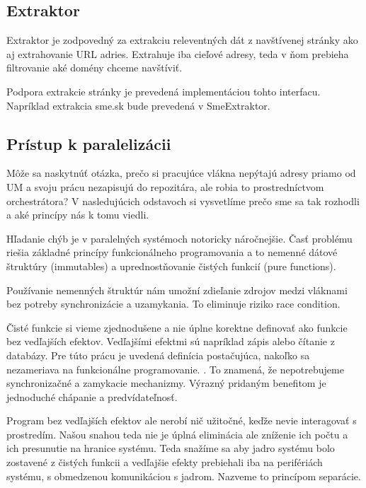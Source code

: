 \subsection{Extraktor}
Extraktor je zodpovedný za extrakciu releventných dát z navštívenej stránky ako aj extrahovanie URL adries. Extrahuje iba cieľové adresy, teda v ňom prebieha filtrovanie aké domény chceme navštíviť. 

Podpora extrakcie stránky je prevedená implementáciou tohto interfacu. Napríklad extrakcia sme.sk bude prevedená v SmeExtraktor.


\subsection{Prístup k paralelizácii}
Môže sa naskytnúť otázka, prečo si pracujúce vlákna nepýtajú adresy priamo od UM a svoju prácu nezapisujú do repozitára, ale robia to prostredníctvom orchestrátora? V nasledujúcich odstavoch si vysvetlíme prečo sme sa tak rozhodli a aké princípy nás k tomu viedli. 

Hľadanie chýb je v paralelných systémoch notoricky náročnejšie. Časť problému riešia základné princípy funkcionálneho programovania a to nemenné dátové štruktúry (immutables) a uprednostňovanie čistých funkcií (pure functions). 

Používanie nemenných štruktúr nám umožní zdieľanie zdrojov medzi vláknami bez potreby synchronizácie a uzamykania. To eliminuje riziko race condition.

Čisté funkcie si vieme zjednodušene a nie úplne korektne definovať ako funkcie bez vedľajších efektov. Vedľajšími efektmi sú napríklad zápis alebo čítanie z databázy. Pre túto prácu je uvedená definícia postačujúca, nakoľko sa nezameriava na funkcionálne programovanie. . To znamená, že nepotrebujeme synchronizačné a zamykacie mechanizmy. Výrazný pridaným benefitom je jednoduché chápanie a predvídateľnosť. 

Program bez vedľajších efektov ale nerobí nič užitočné, keďže nevie interagovať s prostredím. Našou snahou teda nie je úplná eliminácia ale zníženie ich počtu a ich presunutie na hranice systému. Teda snažíme sa aby jadro systému bolo zostavené z čistých funkcii a vedľajšie efekty prebiehali iba na perifériách systému, s obmedzenou komunikáciou s jadrom. Nazveme to princípom separácie.

